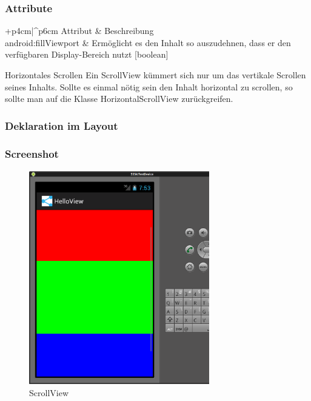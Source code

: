 \begin{frame}
   \frametitle{Attribute}

   \begin{attrDesc}{+p{4cm}|^p{6cm}}
      Attribut & Beschreibung\\
      \hline
      android:fillViewport & Ermöglicht es den Inhalt so auszudehnen, dass er den 
         verfügbaren Display-Bereich nutzt [boolean]\\
   \end{attrDesc}

   \begin{alertblock}{Horizontales Scrollen}
		Ein ScrollView kümmert sich nur um das vertikale Scrollen seines Inhalts. Sollte 
		es einmal nötig sein den Inhalt horizontal zu scrollen, so sollte man auf die 
		Klasse HorizontalScrollView zurückgreifen.
   \end{alertblock}
\end{frame}

\begin{frame}
   \frametitle{Deklaration im Layout}
   
\end{frame}

\begin{frame}
   \frametitle{Screenshot}
   \begin{figure}[h!]
     \centering
     \includegraphics[width=0.7\textwidth]{pictures/scrollview.ps}
     \caption{
        ScrollView
     }
     \label{fig:scrollview}
   \end{figure}
\end{frame}

